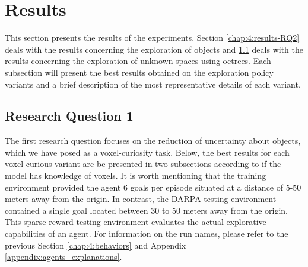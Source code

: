 
\section{Results}\label{chap:4:results}
This section presents the results of the experiments. Section \ref{chap:4:results-RQ2} deals with the results concerning the exploration of objects and \ref{chap:4:results-RQ1} deals with the results concerning the exploration of unknown spaces using octrees. Each subsection will present the best results obtained on the exploration policy variants and a brief description of the most representative details of each variant.


\subsection{Research Question 1}\label{chap:4:results-RQ1}

The first research question focuses on the reduction of uncertainty about objects, which we have posed as a voxel-curiosity task. Below, the best results for each voxel-curious variant are be presented in two subsections according to if the model has knowledge of voxels. 
It is worth mentioning that the training environment provided the agent 6 goals per episode situated at a distance of 5-50 meters away from the origin. 
In contrast, the DARPA testing environment contained a single goal located between 30 to 50 meters away from the origin. This sparse-reward testing environment evaluates the actual explorative capabilities of an agent.
For information on the run names, please refer to the previous Section \ref{chap:4:behaviors} and Appendix \ref{appendix:agents_explanations}.



